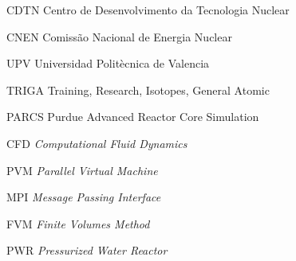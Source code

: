 \documentclass[12pt,openright,twoside,a4paper,english,french,spanish,brazil]{abntex2}
\begin{document}
%  
% 

\listoffigures*
\cleardoublepage

\listoftables*
\cleardoublepage

\begin{siglas}
  \item[CDTN] Centro de Desenvolvimento da Tecnologia Nuclear
  \item[CNEN] Comissão Nacional de Energia Nuclear
  \item[UPV] Universidad Politècnica de Valencia
  \item[TRIGA] Training, Research, Isotopes, General Atomic
  \item[PARCS] Purdue Advanced Reactor Core Simulation
  \item[CFD] \textit{Computational Fluid Dynamics}
  \item[PVM] \textit{Parallel Virtual Machine}
  \item[MPI] \textit{Message Passing Interface}
  \item[FVM] \textit{Finite Volumes Method}
  \item[PWR] \textit{Pressurized Water Reactor}
\end{siglas}


\tableofcontents*
\cleardoublepage
\end{document}
